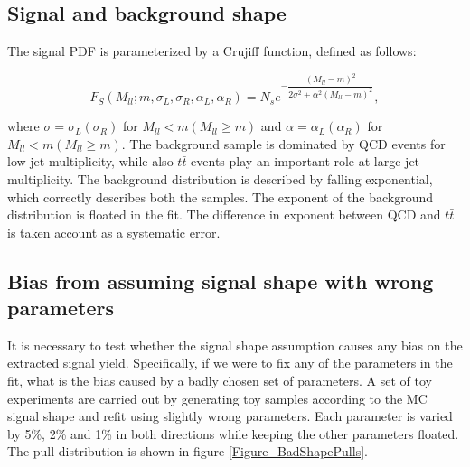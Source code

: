 \documentclass{cmspaper}
\begin{document}

\subsection{Signal and background shape}

The signal PDF is parameterized by a Crujiff function, defined as follows:

\begin{equation}
F_S(M_{ll}; m, \sigma_L, \sigma_R, \alpha_L, \alpha_R) = N_s e^{-\dfrac{(M_{ll} - m)^2}{2 \sigma^2 + \alpha^2 (M_{ll} - m)^2}},\nonumber
\end{equation}

where $\sigma = \sigma_L (\sigma_R)$ for $M_{ll} < m (M_{ll} \geq m)$
and $\alpha = \alpha_L (\alpha_R)$ for $M_{ll} < m (M_{ll} \geq m)$.
The background sample is dominated by QCD events for low jet
multiplicity, while also $t\bar{t}$ events play an important role at
large jet multiplicity.  The background distribution is described by
falling exponential, which correctly describes both the samples.  The
exponent of the background distribution is floated in the fit. The
difference in exponent between QCD and $t \bar t$ is taken account as
a systematic error.

\subsection{Bias from assuming signal shape with wrong parameters}

It is necessary to test whether the signal shape assumption causes any
bias on the extracted signal yield.  Specifically, if we were to fix
any of the parameters in the fit, what is the bias caused by a badly
chosen set of parameters.  A set of toy experiments are carried out by
generating toy samples according to the MC signal shape and refit
using slightly wrong parameters.  Each parameter is varied by 5\%, 2\%
and 1\% in both directions while keeping the other parameters floated.
The pull distribution is shown in figure \ref{Figure_BadShapePulls}.
\end{document}
